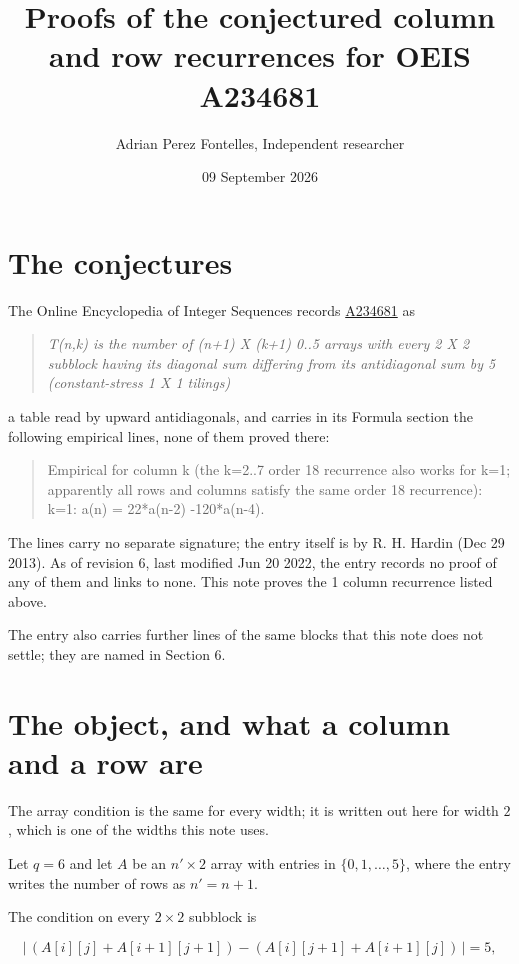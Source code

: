 \documentclass[11pt]{article}
\title{Proofs of the conjectured column and row recurrences for OEIS A234681}
\author{Adrian Perez Fontelles, Independent researcher}
\date{09 September 2026}
\theoremstyle{definition}
\begin{document}
\maketitle
\section{The conjectures}

The Online Encyclopedia of Integer Sequences records \href{https://oeis.org/A234681}{A234681} as

\begin{quote}\itshape T(n,k) is the number of (n+1) X (k+1) 0..5 arrays with every 2 X 2 subblock having its diagonal sum differing from its antidiagonal sum by 5 (constant-stress 1 X 1 tilings)\end{quote}

a table read by upward antidiagonals, and carries in its Formula section the following empirical lines, none of them proved there:

\begin{quote}\ttfamily Empirical for column k (the k=2..7 order 18 recurrence also works for k=1; apparently all rows and columns satisfy the same order 18 recurrence):\\
k=1: a(n) = 22*a(n-2) -120*a(n-4).\end{quote}

The lines carry no separate signature; the entry itself is by R. H. Hardin (Dec 29 2013). As of revision 6, last modified Jun 20 2022, the entry records no proof of any of them and links to none. This note proves the 1 column recurrence listed above.

The entry also carries further lines of the same blocks that this note does not settle; they are named in Section 6.

\section{The object, and what a column and a row are}

The array condition is the same for every width; it is written out here for width $2$, which is one of the widths this note uses.

Let $q = 6$ and let $A$ be an $n' \times 2$ array with entries in $\{0,1,\dots,5\}$, where the entry writes the number of rows as $n' = n + 1$.

The condition on every $2 \times 2$ subblock is

\[\bigl|\,(A[i][j] + A[i{+}1][j{+}1]) - (A[i][j{+}1] + A[i{+}1][j])\,\bigr| = 5,\]
\end{document}
